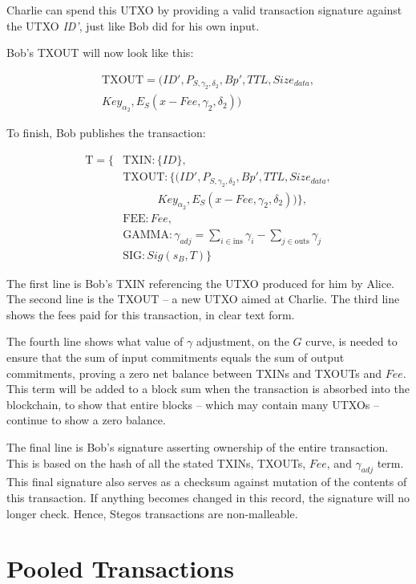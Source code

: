 \documentclass[a4paper, 10pt, conference]{ieeeconf}
\begin{document}
Charlie can spend this UTXO by providing a valid transaction signature against the UTXO \textit{ID'}, just like Bob did for his own input. 

Bob's TXOUT will now look like this:

\begin{multline*}
\text{TXOUT} = (ID', P_{S, \gamma_2, \delta_2}, Bp', TTL, Size_{data},\\ 
                Key_{\alpha_2}, E_S(x - Fee, \gamma_2, \delta_2))
\end{multline*}

To finish, Bob publishes the transaction:

\begin{align*}
\text{T} = \{&\text{TXIN} : \{\mathit{ID}\}, \\
 &\text{TXOUT} : \{(ID', P_{S, \gamma_2, \delta_2}, Bp', TTL, Size_{data}, \\
 & \ \ \ \ \ \ \ \ \ \ \ \ \ \ Key_{\alpha_2}, E_S(x - Fee, \gamma_2, \delta_2))\}, \\
 &\text{FEE} : \mathit{Fee}, \\
 &\text{GAMMA} : \gamma_{\mathit{adj}} = \sum_{i \in \text{ins}}{\gamma_i} - \sum_{j \in \text{outs}}{\gamma_j}\\
 &\text{SIG} : \mathit{Sig}(s_B, T)\}
\end{align*}

The first line is Bob's TXIN referencing the UTXO produced for him by Alice. The second line is the TXOUT -- a new UTXO aimed at Charlie. The third line shows the fees paid for this transaction, in clear text form. 

The fourth line shows what value of $\gamma$ adjustment, on the $G$ curve, is needed to ensure that the sum of input commitments equals the sum of output commitments, proving a zero net balance between TXINs and TXOUTs and $\mathit{Fee}$. This term will be added to a block sum when the transaction is absorbed into the blockchain, to show that entire blocks -- which may contain many UTXOs -- continue to show a zero balance.

The final line is Bob's signature asserting ownership of the entire transaction. This is based on the hash of all the stated TXINs, TXOUTs, $Fee$, and $\gamma_{adj}$ term. This final signature also serves as a checksum against mutation of the contents of this transaction. If anything becomes changed in this record, the signature will no longer check. Hence, Stegos transactions are non-malleable.

\section{Pooled Transactions}\label{pooled_tx}
\end{document}
